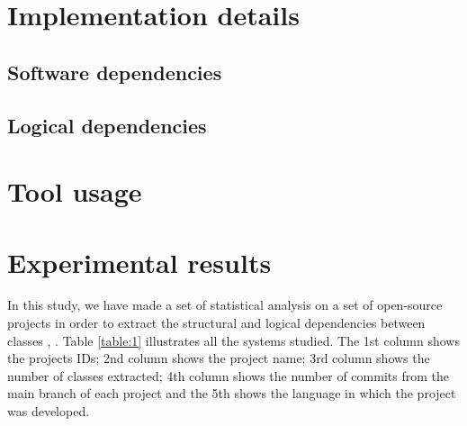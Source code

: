 \documentclass[12pt,a4paper,oneside]{report}
\begin{document}
\chapter{Implementation details}
\section{Software dependencies}
\section{Logical dependencies}

\chapter{Tool usage}

\chapter{Experimental results}
In this study, we have made a set of statistical analysis on a set of open-source projects in order to extract the structural and logical dependencies between classes \cite{ct5}, \cite{ct8} . Table \ref{table:1} illustrates all the systems studied. The 1st column shows the projects IDs; 2nd column shows the project name; 3rd column shows the number of classes extracted; 4th column shows the number of commits from the main branch of each project and the 5th shows the language in which the project was developed.
\end{document}
